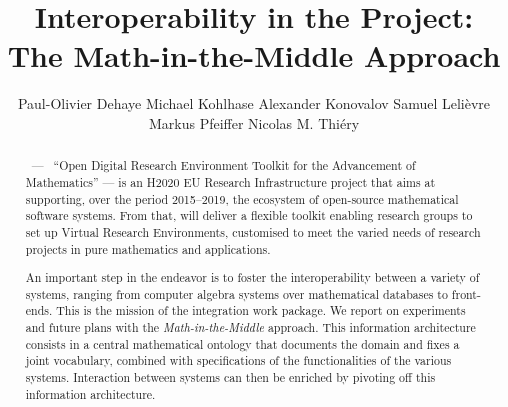 \documentclass{llncs}
\title{Interoperability in the \ODK Project:\\
The Math-in-the-Middle Approach}
\author{Paul-Olivier Dehaye\inst{1} Michael Kohlhase\inst{2} Alexander
  Konovalov\inst{3} Samuel Lelièvre\inst{4} Markus
  Pfeiffer\inst{3} Nicolas M. Thiéry\inst{4}}
\institute{
  University of Z\"urich \and 
  Jacobs University \and 
  University of St~Andrews \and
  Universit\'e Paris-Sud
}
\begin{document}
\maketitle
\begin{abstract}
  \ODK $\,$ --- $\,$ ``Open Digital Research Environment Tool\-kit for the Advancement of
  Mathematics'' --- is an H2020 EU Research Infrastructure project that aims at
  supporting, over the period 2015--2019, the ecosystem of open-source mathematical
  software systems. From that, \ODK will deliver a flexible toolkit enabling research
  groups to set up Virtual Research Environments, customised to meet the varied needs of
  research projects in pure mathematics and applications.

  An important step in the \ODK endeavor is to foster the interoperability between a
  variety of systems, ranging from computer algebra systems over mathematical databases to
  front-ends. This is the mission of the integration work package. We report on
  experiments and future plans with the \emph{Math-in-the-Middle} approach. This
  information architecture consists in a central mathematical ontology that documents the
  domain and fixes a joint vocabulary, combined with specifications of the functionalities
  of the various systems. Interaction between systems can then be enriched by pivoting off
  this information architecture.
\end{abstract}











\printbibliography
\end{document}
